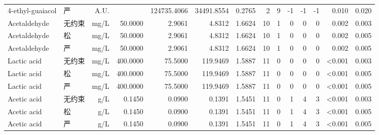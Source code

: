 {\begin{longtable}{llrrrrrrrrrrrr}
4-ethyl-guaiacol & 严 & A.U. &  & 124735.4066 & 34491.8554 & 0.2765 & 2 & 9 & -1 & -1 & -1 & 0.010 & 0.020 \\
Acetaldehyde & 无约束 & mg/L & 50.0000 & 2.9061 & 4.8312 & 1.6624 & 10 & 1 & 0 & 0 & 0 & 0.002 & 0.003 \\
Acetaldehyde & 松 & mg/L & 50.0000 & 2.9061 & 4.8312 & 1.6624 & 10 & 1 & 0 & 0 & 0 & 0.002 & 0.005 \\
Acetaldehyde & 严 & mg/L & 50.0000 & 2.9061 & 4.8312 & 1.6624 & 10 & 1 & 0 & 0 & 0 & 0.002 & 0.005 \\
Lactic acid & 无约束 & mg/L & 400.0000 & 75.5000 & 119.9469 & 1.5887 & 11 & 0 & 0 & 0 & 0 & <0.001 & 0.003 \\
Lactic acid & 松 & mg/L & 400.0000 & 75.5000 & 119.9469 & 1.5887 & 11 & 0 & 0 & 0 & 0 & <0.001 & 0.005 \\
Lactic acid & 严 & mg/L & 400.0000 & 75.5000 & 119.9469 & 1.5887 & 11 & 0 & 0 & 0 & 0 & <0.001 & 0.005 \\
Acetic acid & 无约束 & g/L & 0.1450 & 0.0900 & 0.1391 & 1.5451 & 11 & 0 & 1 & 4 & 3 & <0.001 & 0.003 \\
Acetic acid & 松 & g/L & 0.1450 & 0.0900 & 0.1391 & 1.5451 & 11 & 0 & 1 & 4 & 3 & <0.001 & 0.005 \\
Acetic acid & 严 & g/L & 0.1450 & 0.0900 & 0.1391 & 1.5451 & 11 & 0 & 1 & 4 & 3 & <0.001 & 0.005 \\
\end{longtable}
}

